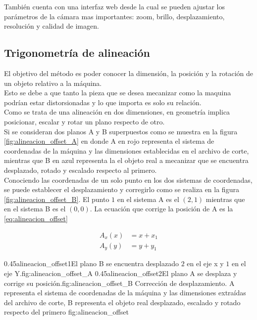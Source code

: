   También cuenta con una interfaz web desde la cual se pueden ajustar los parámetros de la cámara mas importantes: zoom, brillo, desplazamiento, resolución y calidad de imagen.\\

\subsection{Trigonometría de alineación}

   El objetivo del método es poder conocer la dimensión, la posición y la rotación de un objeto relativo a la máquina. \\
Esto se debe a que tanto la pieza que se desea mecanizar como la maquina podrían estar distorsionadas y lo que importa es solo su relación. \\
   Como se trata de una alineación en dos dimensiones, en geometría implica posicionar, escalar y rotar un plano respecto de otro.\\
   Si se consideran dos planos A y B superpuestos como se muestra en la figura \ref{fig:alineacion_offset_A} en donde A en rojo representa el sistema de coordenadas de la máquina y las dimensiones establecidas en el archivo de corte, mientras que B en azul representa la el objeto real a mecanizar que se encuentra desplazado, rotado y escalado respecto al primero.\\
   Conociendo las coordenadas de un solo punto en los dos sistemas de coordenadas, se puede establecer el desplazamiento y corregirlo como se realiza en la figura \ref{fig:alineacion_offset_B}. El punto $1$ en el sistema A es el $(2,1)$ mientras que en el sistema B es el $(0,0)$.
   La ecuación que corrige la posición de A es la \ref{eq:alineacion_offset}

   \begin{equation}
      \begin{aligned}
         A_x(x) &= x+x_1 \\
         A_y(y) &= y+y_1
      \end{aligned}
      \label{eq:alineacion_offset}
   \end{equation}

\subfigab
         {0.45}{alineacion_offset1}{El plano B se encuentra desplazado $2$ en el eje x y $1$ en el eje Y.}{fig:alineacion_offset_A}
         {0.45}{alineacion_offset2}{El plano A se desplaza y corrige su posición.}{fig:alineacion_offset_B}
         {Corrección de desplazamiento. A representa el sistema de coordenadas de la máquina y las dimensiones extraídas del archivo de corte, B representa el objeto real desplazado, escalado y rotado respecto del primero}
         {fig:alineacion_offset}

